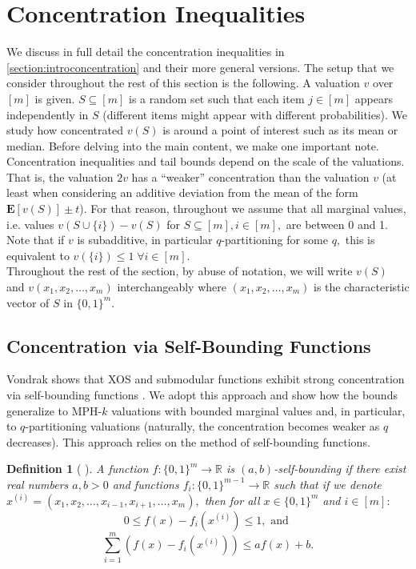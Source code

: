 \documentclass[11pt]{article}%
\newtheorem{definition}[theorem]{Definition}
\numberwithin{theorem}{subsection}
\newcommand{\expect}{\mathbf{E}}
\begin{document}
\section{Concentration Inequalities}
\label{section:concentration}
We discuss in full detail the concentration inequalities in \cref{section:introconcentration} and their more general versions.  The setup that we consider throughout the rest of this section is the following.
A valuation $v$ over $[m]$ is given.
$S\subseteq [m]$ is a random set such that each item $j\in [m]$ appears independently in $S$ (different items might appear with different probabilities). We study how concentrated $v(S)$ is around a point of interest such as its mean or median.  
Before delving into the main content, we make one important note. Concentration inequalities and tail bounds depend on the scale of the valuations. That is, the valuation $2v$ has a ``weaker'' concentration than the valuation $v$ (at least when considering an additive deviation from the mean of the form $\expect[v(S)]\pm t$). For that reason, throughout we assume that all marginal values, i.e. values $v(S\cup\{i\}) - v(S)$ for $S\subseteq [m], i\in [m],$ are between 0 and 1. Note that if $v$ is subadditive, in particular $q$-partitioning for some $q,$ this is equivalent to $v(\{i\})\le 1\; \forall i\in [m]$.\\

\noindent
Throughout the rest of the section, by abuse of notation, we will write $v(S)$ and $v(x_1, x_2, \ldots, x_m)$ interchangeably where $(x_1, x_2, \ldots, x_m)$ is the characteristic vector of $S$ in $\{0,1\}^m.$

\subsection{Concentration via Self-Bounding Functions}
\label{section:selfbounding}
Vondrak shows that XOS and submodular functions exhibit strong concentration via self-bounding functions \cite[Corollary 3.2]{Vondrak10}. We adopt this approach and show how the bounds generalize to MPH-$k$ valuations with bounded marginal values and, in particular, to $q$-partitioning valuations (naturally, the concentration becomes weaker as $q$ decreases). This approach relies on the method of self-bounding functions.

\begin{definition}[{
\cite[Definition 2.3]{Vondrak10}}]
\label{def:selfboundingfunctions}
A function $f:\{0,1\}^m \longrightarrow \mathbb{R}$ is $(a,b)$-self-bounding if there exist real numbers $a,b>0$ and functions $f_i:\{0,1\}^{m-1}\longrightarrow \mathbb{R}$ such that if we denote\linebreak $x^{(i)} = (x_1, x_2, \ldots, x_{i-1}, x_{i+1}, \ldots, x_m),$ then for all $x\in \{0,1\}^m$ and $i\in [m]:$
$$
0\le f(x)-f_i(x^{(i)})\le 1, \text{ and }$$
$$
\sum_{i=1}^m (f(x) - f_i(x^{(i)}))\le 
af(x) + b. 
$$
\end{definition}
\end{document}
